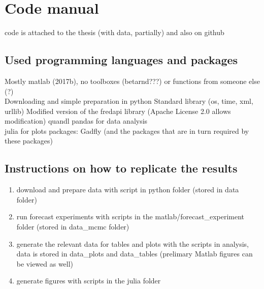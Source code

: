 \chapter{Code manual}

code is attached to the thesis (with data, partially) and also on github

\section{Used programming languages and packages}


Mostly matlab (2017b), no toolboxes (betarnd???) or functions from someone else (?)\\

Downloading and simple preparation in python
Standard library (os, time, xml, urllib)
Modified version of the fredapi library (Apache License 2.0 allows modification)
quandl
pandas for data analysis\\

julia for plots
packages: Gadfly (and the packages that are in turn required by these packages)\\

\section{Instructions on how to replicate the results}

\begin{enumerate}
	\item download and prepare data with script in python folder (stored in data folder)
	\item run forecast experiments with scripts in the matlab/forecast\_experiment folder (stored in data\_mcmc folder)
	\item generate the relevant data for tables and plots with the scripts in analysis, data is stored in data\_plots and data\_tables (prelimary Matlab figures can be viewed as well)
	\item generate figures with scripts in the julia folder
\end{enumerate}